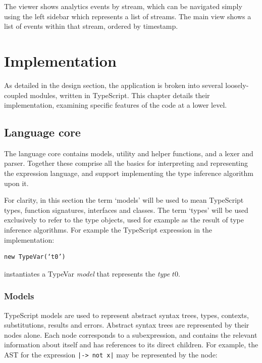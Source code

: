 \documentclass[a4paper,fleqn,12pt]{article}
\begin{document}
The viewer shows analytics events by stream, which can be navigated simply using the left sidebar which represents a list of streams. The main view shows a list of events within that stream, ordered by timestamp.
\section{Implementation}\label{id:h.igepudpadp49}
As detailed in the design section, the application is broken into several loosely-coupled modules, written in TypeScript. This chapter details their implementation, examining specific features of the code at a lower level.

\subsection{Language core}\label{id:h.o3ngfa303saw}
The language core contains models, utility and helper functions, and a lexer and parser. Together these comprise all the basics for interpreting and representing the expression language, and support implementing the type inference algorithm upon it.

For clarity, in this section the term ‘models’ will be used to mean TypeScript types, function signatures, interfaces and classes. The term ‘types’ will be used exclusively to refer to the type objects, used for example as the result of type inference algorithms. For example the TypeScript expression in the implementation:

\begin{verbatim}
new TypeVar(‘t0’)
\end{verbatim}

instantiates a TypeVar \textit{model} that represents the \textit{type} $t0$.
\subsubsection{Models}\label{id:h.f0aymht9bwx3}
TypeScript models are used to represent abstract syntax trees, types, contexts, substitutions, results and errors.
\label{id:h.26q0jf334v10}
Abstract syntax trees are represented by their nodes alone. Each node corresponds to a subexpression, and contains the relevant information about itself and has references to its direct children. For example, the AST for the expression \texttt{|\x -> not x|} may be represented by the node:
\end{document}
